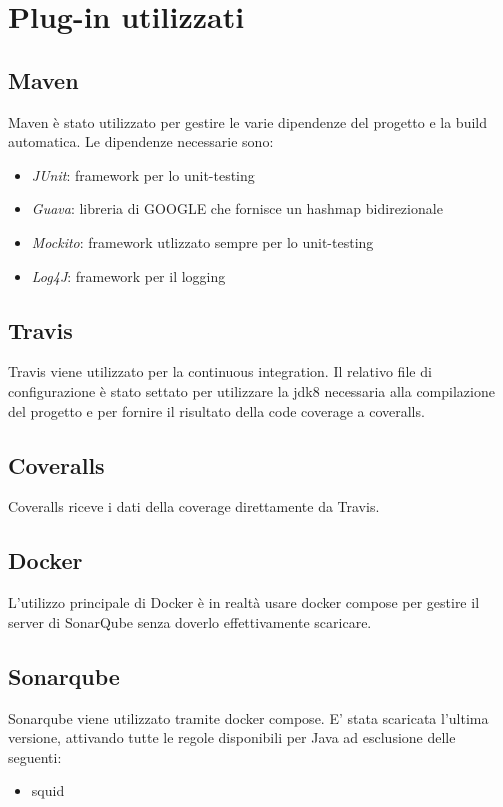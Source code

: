 \chapter{Plug-in utilizzati}
	\section{Maven}
		Maven è stato utilizzato per gestire le varie dipendenze del progetto e la build automatica.
		Le dipendenze necessarie sono: 
		\begin{itemize}
			\item \emph{JUnit}: framework per lo unit-testing
			\item \emph{Guava}: libreria di GOOGLE che fornisce un hashmap bidirezionale
			\item \emph{Mockito}: framework utlizzato sempre per lo unit-testing
			\item \emph{Log4J}: framework per il logging 
		\end{itemize}
		
	\section{Travis}
		Travis viene utilizzato per la continuous integration. Il relativo file di configurazione è stato settato per utilizzare la jdk8 necessaria alla compilazione del progetto e per fornire il risultato della code coverage a coveralls.
		
	\section{Coveralls}
		Coveralls riceve i dati della coverage direttamente da Travis.
		
	\section{Docker}
		L'utilizzo principale di Docker è in realtà usare docker compose per gestire il server di SonarQube senza doverlo effettivamente scaricare. 
		
	\section{Sonarqube}
		Sonarqube viene utilizzato tramite docker compose. E' stata scaricata l'ultima versione, attivando tutte le regole disponibili per Java ad esclusione delle seguenti:
		\begin{itemize}
			\item squid
		\end{itemize}